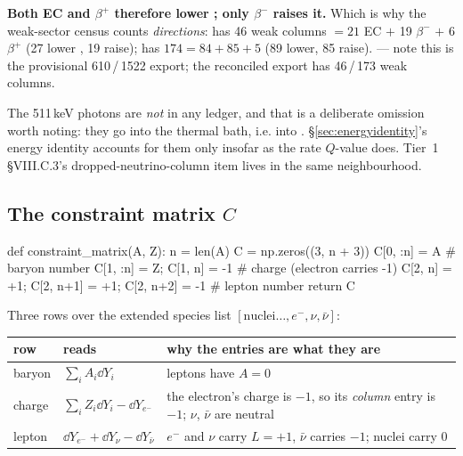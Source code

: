 \textbf{Both EC and $\beta^+$ therefore lower \Ye; only $\beta^-$ raises it.}
Which is why the weak-sector census counts \emph{directions}:  has 46
weak columns $= 21$ EC $+$ 19 $\beta^-$ $+$ 6 $\beta^+$ (27 lower \Ye, 19
raise);  has $174 = 84 + 85 + 5$ (89 lower, 85 raise).
 --- note this is the provisional 610\,/\,1522 export;
the reconciled export has 46\,/\,173 weak columns.\derivedhere

The 511\,keV photons are \emph{not} in any ledger, and that is a deliberate
omission worth noting: they go into the thermal bath, i.e. into \enuc.
\S\ref{sec:energyidentity}'s energy identity accounts for them only insofar as
the rate $Q$-value does. Tier~1 \S VIII.C.3's dropped-neutrino-column item lives
in the same neighbourhood.

\subsection{The constraint matrix \texorpdfstring{$C$}{C}}
\label{sec:cmatrix}

\begin{srclisting}
def constraint_matrix(A, Z):
    n = len(A)
    C = np.zeros((3, n + 3))
    C[0, :n] = A                # baryon number
    C[1, :n] = Z; C[1, n] = -1  # charge  (electron carries -1)
    C[2, n] = +1; C[2, n+1] = +1; C[2, n+2] = -1   # lepton number
    return C
\end{srclisting}

Three rows over the extended species list $[\text{nuclei}\ldots, e^-, \nu,
\bar\nu]$:

\begin{center}
\begin{tabularx}{\textwidth}{@{}L{1.6cm} L{3.4cm} Y@{}}
\toprule
\textbf{row} & \textbf{reads} & \textbf{why the entries are what they are} \\
\midrule
baryon & $\sum_i A_i \dd Y_i$ & leptons have $A = 0$ \\
charge & $\sum_i Z_i \dd Y_i - \dd Y_{e^-}$ &
  the electron's charge is $-1$, so its \emph{column} entry is $-1$; $\nu$,
  $\bar\nu$ are neutral \\
lepton & $\dd Y_{e^-} + \dd Y_\nu - \dd Y_{\bar\nu}$ &
  $e^-$ and $\nu$ carry $L = +1$, $\bar\nu$ carries $-1$; nuclei carry 0 \\
\bottomrule
\end{tabularx}
\end{center}

